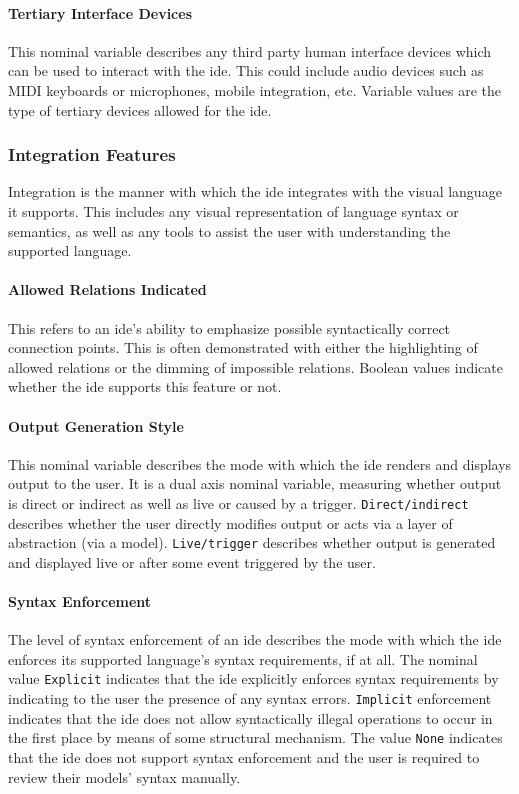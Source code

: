 \paragraph{Tertiary Interface Devices}
This nominal variable describes any
third party human interface devices which can be used to interact with the
\ac{ide}. This could include audio devices such as MIDI keyboards or
microphones, mobile integration, etc. Variable values are the type of
tertiary devices allowed for the \ac{ide}.


\subsubsection{Integration Features} \label{subsubsec:integration}

Integration is the manner with which the \ac{ide} integrates with the visual
language it supports. This includes any visual representation of language
syntax or semantics, as well as any tools to assist the user with
understanding the supported language.


\paragraph{Allowed Relations Indicated}
This refers to an \ac{ide}'s ability to
emphasize possible syntactically correct connection points. This is often
demonstrated with either the highlighting of allowed relations or the
dimming of impossible relations.
Boolean values indicate whether the \ac{ide}
supports this feature or not.


\paragraph{Output Generation Style}
This nominal variable describes the
mode with which the \ac{ide} renders and displays output to the user. It is a
dual axis nominal variable, measuring whether output is direct or indirect
as well as live or caused by a trigger. \texttt{Direct/indirect} describes
whether the user directly modifies output or acts via a layer of
abstraction (\eg via a model).
\texttt{Live/trigger} describes whether output is generated and displayed live or after some event triggered by the user.


\paragraph{Syntax Enforcement}
The level of syntax enforcement of an \ac{ide}
describes the mode with which the \ac{ide} enforces its supported language's
syntax requirements, if at all.
The nominal value \texttt{Explicit}
indicates that the \ac{ide} explicitly enforces syntax requirements by
indicating to the user the presence of any syntax errors. \texttt{Implicit}
enforcement indicates that the \ac{ide} does not allow syntactically illegal
operations to occur in the first place by means of some structural
mechanism. The value \texttt{None} indicates that the \ac{ide} does not support
syntax enforcement and the user is required to review their models' syntax
manually.


